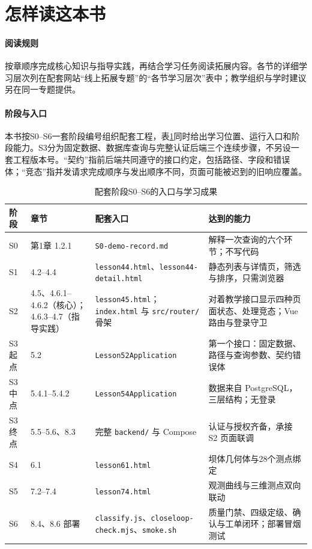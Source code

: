 \section*{怎样读这本书}

\paragraph{阅读规则}按章顺序完成核心知识与指导实践，再结合学习任务阅读拓展内容。各节的详细学习层次列在配套网站“线上拓展专题”的“各节学习层次”表中；教学组织与学时建议另在同一专题提供。

\paragraph{阶段与入口}本书按S0--S6一套阶段编号组织配套工程，表\ref{tab:preface-version-stage}同时给出学习位置、运行入口和阶段能力。S3分为固定数据、数据库查询与完整认证后端三个连续步骤，不另设一套工程版本号。“契约”指前后端共同遵守的接口约定，包括路径、字段和错误体；“竞态”指并发请求完成顺序与发出顺序不同，页面可能被迟到的旧响应覆盖。

\begin{table}[htbp]
\centering
\small
\caption{配套阶段S0--S6的入口与学习成果}
\label{tab:preface-version-stage}
\begin{tabular}{p{1.6cm}p{2.0cm}p{5.0cm}p{4.6cm}}
\toprule
阶段 & 章节 & 配套入口 & 达到的能力 \\
\midrule
S0 & 第1章 1.2.1 & \texttt{S0-demo-record.md} & 解释一次查询的六个环节；不写代码 \\
S1 & 4.2--4.4 & \texttt{lesson44.html}、\texttt{lesson44-detail.html} & 静态列表与详情页，筛选与排序，只需浏览器 \\
S2 & 4.5、4.6.1--4.6.2（核心）；4.6.3--4.7（指导实践） & \texttt{lesson45.html}；\texttt{index.html} 与 \texttt{src/router/} 骨架 & 对着教学接口显示四种页面状态、处理竞态；Vue 路由与登录守卫 \\
S3 起点 & 5.2 & \texttt{Lesson52Application} & 第一个接口：固定数据、路径与查询参数、契约错误体 \\
S3 中点 & 5.4.1--5.4.2 & \texttt{Lesson54Application} & 数据来自 PostgreSQL，三层结构；无登录 \\
S3 终点 & 5.5--5.6、8.3 & 完整 \texttt{backend/} 与 Compose & 认证与授权齐备，承接 S2 页面联调 \\
S4 & 6.1 & \texttt{lesson61.html} & 坝体几何体与28个测点绑定 \\
S5 & 7.2--7.4 & \texttt{lesson74.html} & 观测曲线与三维测点双向联动 \\
S6 & 8.4、8.6 部署 & \texttt{classify.js}、\texttt{closeloop-check.mjs}、\texttt{smoke.sh} & 质量门禁、四级定级、确认与工单闭环；部署冒烟测试 \\
\bottomrule
\end{tabular}
\end{table}

